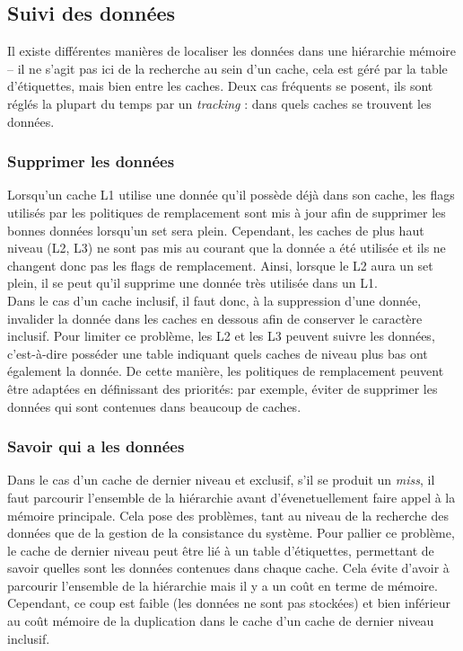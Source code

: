 \subsection{Suivi des données}
 Il existe différentes manières de localiser les données dans une hiérarchie mémoire -- il ne s'agit pas ici de la recherche au sein d'un cache, cela est géré par la table d'étiquettes, mais bien entre les caches. Deux cas fréquents se posent, ils sont réglés la plupart du temps par un \textit{tracking} : dans quels caches se trouvent les données.

\subsubsection{Supprimer les données}
Lorsqu'un cache L1 utilise une donnée qu'il possède déjà dans son cache, les flags utilisés par les politiques de remplacement sont mis à jour afin de supprimer les bonnes données lorsqu'un set sera plein. Cependant, les caches de plus haut niveau (L2, L3) ne sont pas mis au courant que la donnée a été utilisée et ils ne changent donc pas les flags de remplacement. Ainsi, lorsque le L2 aura un set plein, il se peut qu'il supprime une donnée très utilisée dans un L1. \\

Dans le cas d'un cache inclusif, il faut donc, à la suppression d'une donnée, invalider la donnée dans les caches en dessous afin de conserver le caractère inclusif. Pour limiter ce problème, les L2 et les L3 peuvent suivre les données, c'est-à-dire posséder une table indiquant quels caches de niveau plus bas ont également la donnée. De cette manière, les politiques de remplacement peuvent être adaptées en définissant des priorités: par exemple, éviter de supprimer les données qui sont contenues dans beaucoup de caches.

\subsubsection{Savoir qui a les données}
Dans le cas d'un cache de dernier niveau et exclusif, s'il se produit un \textit{miss}, il faut parcourir l'ensemble de la hiérarchie avant d'évenetuellement faire appel à la mémoire principale. Cela pose des problèmes, tant au niveau de la recherche des données que de la gestion de la consistance du système. Pour pallier ce problème, le cache de dernier niveau peut être lié à un table d'étiquettes, permettant de savoir quelles sont les données contenues dans chaque cache. Cela évite d'avoir à parcourir l'ensemble de la hiérarchie mais il y a un coût en terme de mémoire. Cependant, ce coup est faible (les données ne sont pas stockées) et bien inférieur au coût mémoire de la duplication dans le cache d'un cache de dernier niveau inclusif.
